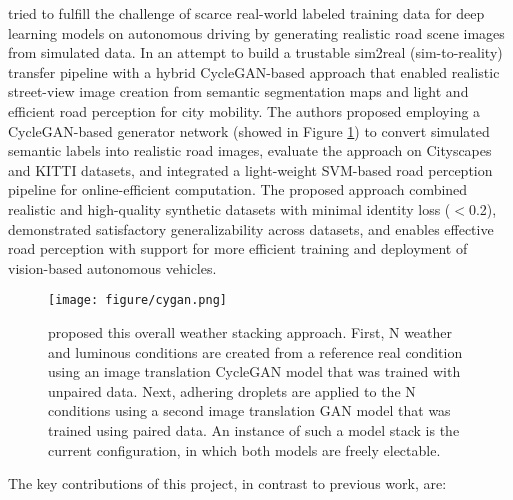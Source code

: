 \documentclass[pdflatex,sn-mathphys-num]{sn-jnl}%
\theoremstyle{thmstyleone}%
\theoremstyle{thmstyletwo}%
\theoremstyle{thmstylethree}%
\begin{document}
\citet{rajagopal2023hybrid} tried to fulfill the challenge of scarce real-world labeled training data for deep learning models on autonomous driving by generating realistic road scene images from simulated data. In an attempt to build a trustable sim2real (sim-to-reality) transfer pipeline with a hybrid CycleGAN-based approach that enabled realistic street-view image creation from semantic segmentation maps and light and efficient road perception for city mobility. The authors proposed employing a CycleGAN-based generator network (showed in Figure \ref{fig1}) to convert simulated semantic labels into realistic road images, evaluate the approach on Cityscapes and KITTI datasets, and integrated a light-weight SVM-based road perception pipeline for online-efficient computation. The proposed approach combined realistic and high-quality synthetic datasets with minimal identity loss ($<$0.2), demonstrated satisfactory generalizability across datasets, and enables effective road perception with support for more efficient training and deployment of vision-based autonomous vehicles.

\begin{figure}[h]
\centering
\texttt{[image: figure/cygan.png]}
\caption{\citet{rajagopal2023hybrid} proposed this overall weather stacking approach.  First, N weather and luminous conditions are created from a reference real condition using an image translation CycleGAN model that was trained with unpaired data.  Next, adhering droplets are applied to the N conditions using a second image translation GAN model that was trained using paired data.  An instance of such a model stack is the current configuration, in which both models are freely electable.}\label{fig1}
\end{figure}

The key contributions of this project, in contrast to previous work, are:
\end{document}
